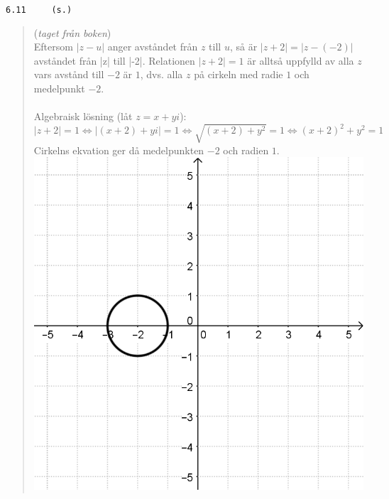 \documentclass[a4paper]{article}
\newcommand{\tskcol}[1]{\textcolor{tskcol}{#1}}
\begin{document}
	\pagebreak
	\texttt{\tskcol{6.11~~~~ (s.)}}
	\begin{quotation}
		\noindent
		(\emph{taget från boken}) \\
		Eftersom $|z-u|$ anger avståndet från $z$ till $u$, så är $|z+2|=|z-(-2)|$ avståndet från |z| till |-2|. Relationen $|z+2|=1$ är alltså uppfylld av alla $z$ vars avstånd till $-2$ är $1$, dvs. alla $z$ på cirkeln med radie $1$ och medelpunkt $-2$. \\ \\
		Algebraisk lösning (låt $z=x+yi$):
		\[|z+2|=1 \Leftrightarrow
		|(x+2)+yi|=1 \Leftrightarrow
		\sqrt{(x+2)+y^2}=1 \Leftrightarrow
		(x+2)^2+y^2=1\]
		Cirkelns ekvation ger då medelpunkten $-2$ och radien $1$. \\
		\includegraphics[scale=0.2]{images/611.PNG}
	\end{quotation}
	
\end{document}

